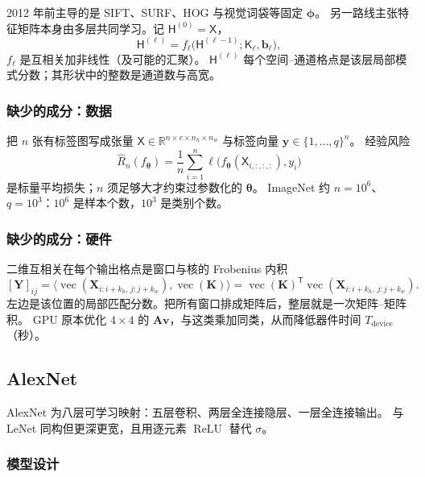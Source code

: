 2012 年前主导的是 SIFT、SURF、HOG 与视觉词袋等固定 $\bm{\phi}$。
另一路线主张特征矩阵本身由多层共同学习。记 $\mathsf{H}^{(0)}=\mathsf{X}$，
\[
\mathsf{H}^{(\ell)}
=
f_\ell\bigl(\mathsf{H}^{(\ell-1)};\mathsf{K}_\ell,\bm{b}_\ell\bigr),
\]
$f_\ell$ 是互相关加非线性（及可能的汇聚）。
$\mathsf{H}^{(\ell)}$ 每个空间--通道格点是该层局部模式分数；其形状中的整数是通道数与高宽。

\subsubsection{缺少的成分：数据}

把 $n$ 张有标签图写成张量 $\mathsf{X}\in\mathbb{R}^{n\times c\times n_h\times n_w}$ 与标签向量 $\bm{y}\in\{1,\ldots,q\}^{n}$。
经验风险
\[
\hat{R}_n(f_{\bm{\theta}})
=
\frac{1}{n}\sum_{i=1}^{n}
\ell\bigl(f_{\bm{\theta}}(\mathsf{X}_{i,:,:,:}),y_i\bigr)
\]
是标量平均损失；$n$ 须足够大才约束过参数化的 $\bm{\theta}$。
ImageNet 约 $n=10^{6}$、$q=10^{3}$：$10^{6}$ 是样本个数，$10^{3}$ 是类别个数。

\subsubsection{缺少的成分：硬件}

二维互相关在每个输出格点是窗口与核的 Frobenius 内积
\[
[\bm{Y}]_{ij}
=
\bigl\langle
\operatorname{vec}(\bm{X}_{i:i+k_h,\,j:j+k_w}),
\operatorname{vec}(\bm{K})
\bigr\rangle
=
\operatorname{vec}(\bm{K})^{\mathsf T}
\operatorname{vec}(\bm{X}_{i:i+k_h,\,j:j+k_w}).
\]
左边是该位置的局部匹配分数。把所有窗口排成矩阵后，整层就是一次矩阵--矩阵积。
GPU 原本优化 $4\times 4$ 的 $\bm{A}\bm{v}$，与这类乘加同类，从而降低器件时间 $T_{\mathrm{device}}$（秒）。

\subsection{AlexNet}

AlexNet 为八层可学习映射：五层卷积、两层全连接隐层、一层全连接输出。
与 LeNet 同构但更深更宽，且用逐元素 $\operatorname{ReLU}$ 替代 $\sigma$。

\subsubsection{模型设计}

